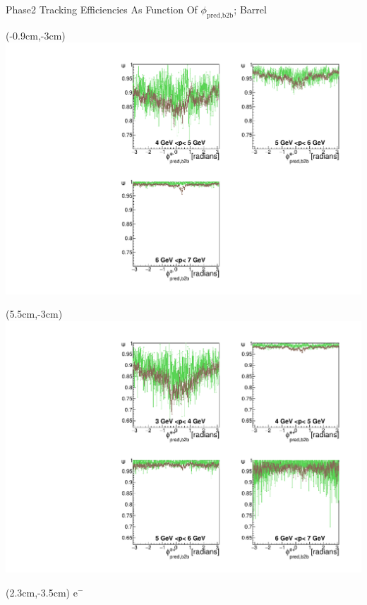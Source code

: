 \documentclass[8pt]{beamer}
\begin{document}
\begin{frame}{Phase2 Tracking Efficiencies As Function Of $\phi_{\textrm{pred,b2b}}$; Barrel}
	
	
	\begin{textblock*}{6.5cm}(-0.9cm,-3cm)
		\includegraphics[width=\textwidth]{VPlots/P2/xPMPhiemBarrel}
	\end{textblock*}
	
	\begin{textblock*}{6.5cm}(5.5cm,-3cm)
		\includegraphics[width=\textwidth]{VPlots/P2/xPMPhiepBarrel}
	\end{textblock*}
	
	
	\begin{textblock*}{2cm}(2.3cm,-3.5cm)
		$\textrm{e}^-$
	\end{textblock*}
	

\end{frame}
\end{document}
